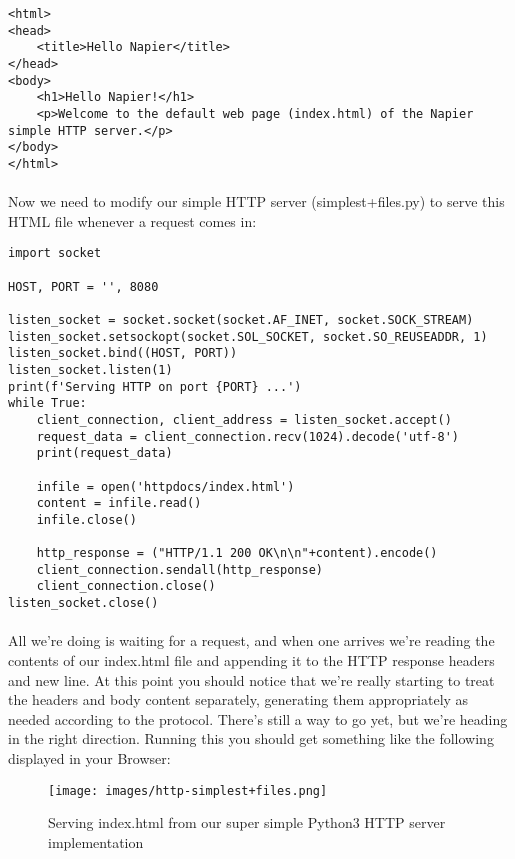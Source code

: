 \begin{lstlisting}
<html>
<head>
    <title>Hello Napier</title>
</head>
<body>
    <h1>Hello Napier!</h1>
    <p>Welcome to the default web page (index.html) of the Napier simple HTTP server.</p>
</body>
</html>
\end{lstlisting}

\paragraph{} Now we need to modify our simple HTTP server (simplest+files.py) to serve this HTML file whenever a request comes in:

\begin{lstlisting}
import socket

HOST, PORT = '', 8080

listen_socket = socket.socket(socket.AF_INET, socket.SOCK_STREAM)
listen_socket.setsockopt(socket.SOL_SOCKET, socket.SO_REUSEADDR, 1)
listen_socket.bind((HOST, PORT))
listen_socket.listen(1)
print(f'Serving HTTP on port {PORT} ...')
while True:
    client_connection, client_address = listen_socket.accept()
    request_data = client_connection.recv(1024).decode('utf-8')
    print(request_data)

    infile = open('httpdocs/index.html')
    content = infile.read()
    infile.close()

    http_response = ("HTTP/1.1 200 OK\n\n"+content).encode() 
    client_connection.sendall(http_response)
    client_connection.close()
listen_socket.close()
\end{lstlisting}

\paragraph{} All we're doing is waiting for a request, and when one arrives we're reading the contents of our index.html file and appending it to the HTTP response headers and new line. At this point you should notice that we're really starting to treat the headers and body content separately, generating them appropriately as needed according to the protocol. There's still a way to go yet, but we're heading in the right direction. Running this you should get something like the following displayed in your Browser:

\begin{figure}[H]
\centering
\texttt{[image: images/http-simplest+files.png]}
\caption{Serving index.html from our super simple Python3 HTTP server implementation}
\label{fig:http-simplest+files}
\end{figure}

